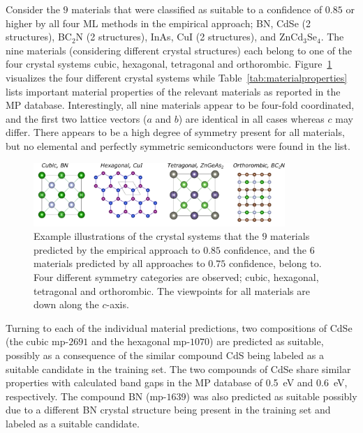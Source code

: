 \documentclass[superscriptaddress,
preprint,
 amsmath,amssymb,
 aps,
]{revtex4-2}
\begin{document}
Consider the $9$ materials that were classified as suitable to a confidence of $0.85$ or higher by all four ML methods in the empirical approach; BN, CdSe (2 structures), BC$_2$N (2 structures), InAs, CuI (2 structures), and ZnCd$_3$Se$_4$. 
The nine materials (considering different crystal structures) each belong to one of the four crystal systems cubic, hexagonal, tetragonal and orthorombic. Figure~\ref{fig:crystalsystems} visualizes the four different crystal systems while Table~\ref{tab:materialproperties} lists important material properties of the relevant materials as reported in the MP database.  Interestingly, all nine materials appear to be four-fold coordinated, and the first two lattice vectors ($a$ and $b$) are identical in all cases whereas $c$ may differ.  
There appears to be a high degree of symmetry present for all materials, but no elemental and perfectly symmetric semiconductors were found in the list. 

\begin{figure}[t]
    \centering
    \includegraphics[width=0.85\textwidth]{figure6.png}
    \caption{Example illustrations of the crystal systems that the $9$ materials predicted by the empirical approach to $0.85$ confidence, and the $6$ materials predicted by all approaches to $0.75$ confidence, belong to. Four different symmetry categories are observed; cubic, hexagonal, tetragonal and orthorombic. The viewpoints for all materials are down along the $c$-axis.   }
    \label{fig:crystalsystems}
\end{figure}

Turning to each of the individual material predictions, two compositions of CdSe (the cubic mp-$2691$ and the hexagonal mp-$1070$) are predicted as suitable, possibly as a consequence of the similar compound CdS being labeled as a suitable candidate in the training set.  
The two compounds of CdSe share similar properties with calculated band gaps in the MP database of \SI{0.5}{\electronvolt} and \SI{0.6}{\electronvolt}, respectively. 
The compound BN (mp-$1639$) was also predicted as suitable possibly due to a different BN crystal structure being present in the training set and labeled as a suitable candidate. 
\end{document}
